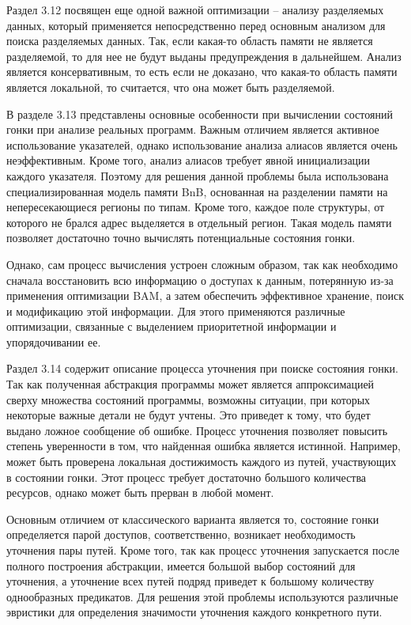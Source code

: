 Раздел 3.12 посвящен еще одной важной оптимизации -- анализу разделяемых данных, который применяется непосредственно перед основным анализом для поиска разделяемых данных.
Так, если какая-то область памяти не является разделяемой, то для нее не будут выданы предупреждения в дальнейшем.
Анализ является консервативным, то есть если не доказано, что какая-то область памяти является локальной, то считается, что она может быть разделяемой.

В разделе 3.13 представлены основные особенности при вычислении состояний гонки при анализе реальных программ.
Важным отличием является активное использование указателей, однако использование анализа алиасов является очень неэффективным.
Кроме того, анализ алиасов требует явной инициализации каждого указателя. Поэтому для решения данной проблемы была использована специализированная модель памяти BnB, основанная на разделении памяти на непересекающиеся регионы по типам.
Кроме того, каждое поле структуры, от которого не брался адрес выделяется в отдельный регион.
Такая модель памяти позволяет достаточно точно вычислять потенциальные состояния гонки.

Однако, сам процесс вычисления устроен сложным образом, так как необходимо сначала восстановить всю информацию о доступах к данным, потерянную из-за применения оптимизации BAM, а затем обеспечить эффективное хранение, поиск и модификацию этой информации.
Для этого применяются различные оптимизации, связанные с выделением приоритетной информации и упорядочивании ее. 

Раздел 3.14 содержит описание процесса уточнения при поиске состояния гонки.
Так как полученная абстракция программы может является аппроксимацией сверху множества состояний программы, возможны ситуации, при которых некоторые важные детали не будут учтены. 
Это приведет к тому, что будет выдано ложное сообщение об ошибке. 
Процесс уточнения позволяет повысить степень уверенности в том, что найденная ошибка является истинной.
Например, может быть проверена локальная достижимость каждого из путей, участвующих в состоянии гонки.
Этот процесс требует достаточно большого количества ресурсов, однако может быть прерван в любой момент.

Основным отличием от классического варианта является то, состояние гонки определяется парой доступов, соответственно, возникает необходимость уточнения пары путей.
Кроме того, так как процесс уточнения запускается после полного построения абстракции, имеется большой выбор состояний для уточнения, а уточнение всех путей подряд приведет к большому количеству однообразных предикатов.
Для решения этой проблемы используются различные эвристики для определения значимости уточнения каждого конкретного пути.

